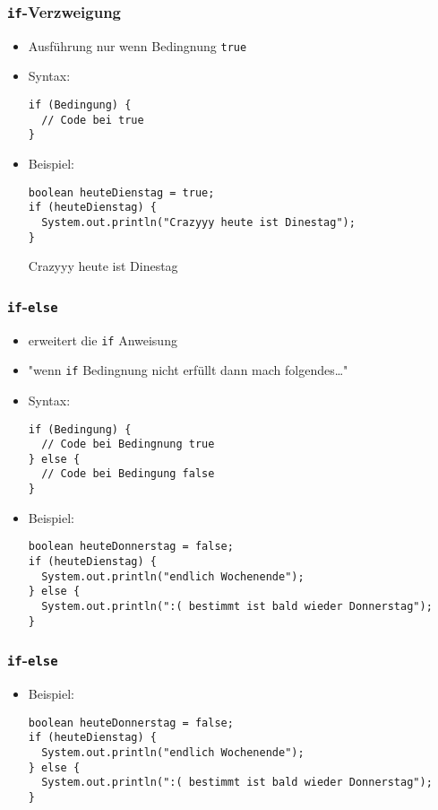 \documentclass{../../presentation}
\begin{document}
\begin{frame}[fragile]
  \frametitle{\texttt{if}-Verzweigung}

  \begin{itemize}
    \item<1-> Ausführung nur wenn Bedingnung \texttt{true}
    \item<1-> Syntax:
      \begin{verbatim}
if (Bedingung) {
  // Code bei true
}
      \end{verbatim}
    \item<2-> Beispiel:
      \begin{verbatim}
boolean heuteDienstag = true;
if (heuteDienstag) {
  System.out.println("Crazyyy heute ist Dinestag");
}
      \end{verbatim}
      \begin{ausgabe}
      Crazyyy heute ist Dinestag
      \end{ausgabe}     
  \end{itemize}
\end{frame}



\begin{frame}[fragile]
  \frametitle{\texttt{if}-\texttt{else}}

  \begin{itemize}
    \item<1-> erweitert die \texttt{if} Anweisung
    \item<1-> "wenn \texttt{if} Bedingnung nicht erfüllt dann mach folgendes\dots"
    \item<1-> Syntax:
\begin{verbatim}
if (Bedingung) {
  // Code bei Bedingnung true
} else {
  // Code bei Bedingung false
}
\end{verbatim}
    \item<2-> Beispiel:
\begin{verbatim}
boolean heuteDonnerstag = false;
if (heuteDienstag) {
  System.out.println("endlich Wochenende");
} else {
  System.out.println(":( bestimmt ist bald wieder Donnerstag");
}
\end{verbatim}
  \end{itemize}
\end{frame}

\begin{frame}[fragile]
    \frametitle{\texttt{if}-\texttt{else}}
    \begin{itemize}
            \item<1-> Beispiel:
\begin{verbatim}
boolean heuteDonnerstag = false;
if (heuteDienstag) {
  System.out.println("endlich Wochenende");
} else {
  System.out.println(":( bestimmt ist bald wieder Donnerstag");
}
\end{verbatim}
    \end{itemize}
\end{frame}
\end{document}
